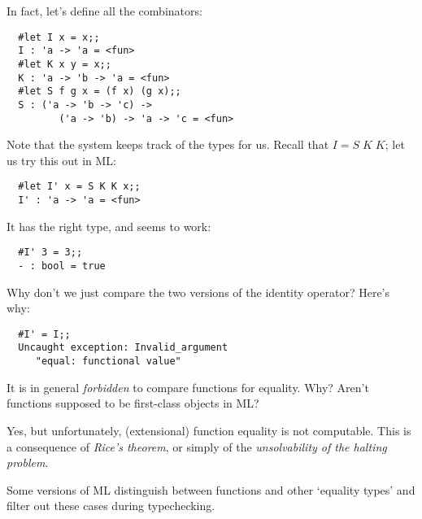 \begin{slide*}


\vspace*{0.5cm}

In fact, let's define all the combinators:

\begin{black}
\begin{verbatim}
  #let I x = x;;
  I : 'a -> 'a = <fun>
  #let K x y = x;;
  K : 'a -> 'b -> 'a = <fun>
  #let S f g x = (f x) (g x);;
  S : ('a -> 'b -> 'c) ->
         ('a -> 'b) -> 'a -> 'c = <fun>
\end{verbatim}
\end{black}

Note that the system keeps track of the types for us. Recall that {\red $I =
S\; K\; K$}; let us try this out in ML:
\begin{black}
\begin{verbatim}
  #let I' x = S K K x;;
  I' : 'a -> 'a = <fun>
\end{verbatim}
\end{black}
It has the right type, and seems to work:
\begin{black}
\begin{verbatim}
  #I' 3 = 3;;
  - : bool = true
\end{verbatim}
\end{black}

\end{slide*}


\begin{slide*}


\vspace*{0.5cm}

Why don't we just compare the two versions of the identity operator? Here's
why:

\begin{black}
\begin{verbatim}
  #I' = I;;
  Uncaught exception: Invalid_argument
     "equal: functional value"
\end{verbatim}
\end{black}

It is in general {\em forbidden} to compare functions for equality. Why? Aren't
functions supposed to be first-class objects in ML?

Yes, but unfortunately, (extensional) function equality is not computable. This
is a consequence of {\em Rice's theorem}, or simply of the {\em unsolvability
of the halting problem}.

Some versions of ML distinguish between functions and other `equality types'
and filter out these cases during typechecking.

\end{slide*}




